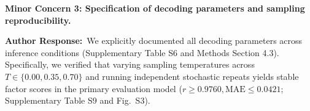 \documentclass[11pt]{article}
\newcommand{\reviewercomment}[1]{\vspace{1em}\noindent\textbf{\color{blue!80!black}#1}\vspace{0.4em}}
\newcommand{\authorsresponse}{\noindent\textbf{\color{black}Author Response:}\ }
\begin{document}
\reviewercomment{Minor Concern 3: Specification of decoding parameters and sampling reproducibility.}

\authorsresponse We explicitly documented all decoding parameters across inference conditions (Supplementary Table S6 and Methods Section 4.3). Specifically, we verified that varying sampling temperatures across $T \in \{0.00, 0.35, 0.70\}$ and running independent stochastic repeats yields stable factor scores in the primary evaluation model ($r \ge 0.9760, \text{MAE} \le 0.0421$; Supplementary Table S9 and Fig.~S3).
\end{document}
